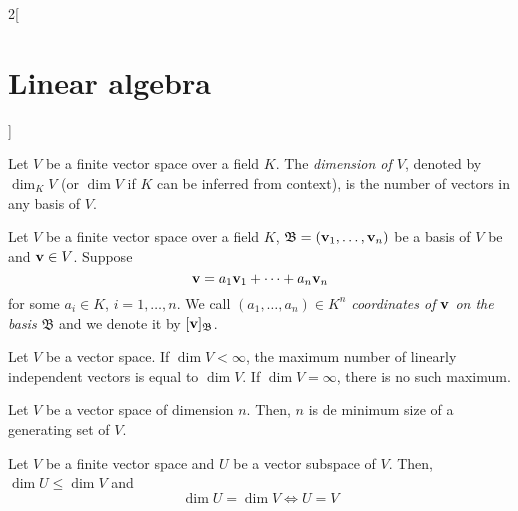 \documentclass[../../../main.tex]{subfiles}
\begin{document}
\begin{multicols}{2}[\section{Linear algebra}]
\begin{lemma}
  \end{lemma}
  \begin{definition}
    Let $V$ be a finite vector space over a field $K$. The \textit{dimension of $V$}, denoted by $\dim_K V$ (or $\dim V$ if $K$ can be inferred from context), is the number of vectors in any basis of $V$.
  \end{definition}
  \begin{definition}
    Let $V$ be a finite vector space over a field $K$, $\mathfrak{B}=(\boldsymbol{\mathrm{v}}_1,\ldots,\boldsymbol{\mathrm{v}}_n)$ be a basis of $V$ be and $\boldsymbol{\mathrm{v}}\in V$. Suppose $$\boldsymbol{\mathrm{v}}=a_1\boldsymbol{\mathrm{v}}_1+\cdots+a_n\boldsymbol{\mathrm{v}}_n$$ for some $a_i\in K$, $i=1,\ldots,n$. We call $(a_1,\ldots,a_n)\in K^n$ \textit{coordinates of $\boldsymbol{\mathrm{v}}$ on the basis $\mathfrak{B}$} and we denote it by $[\boldsymbol{\mathrm{v}}]_{\mathfrak{B}}$.
  \end{definition}
  \begin{prop}
    Let $V$ be a vector space. If $\dim V<\infty$, the maximum number of linearly independent vectors is equal to $\dim V$. If $\dim V=\infty$, there is no such maximum.
  \end{prop}
  \begin{prop}
    Let $V$ be a vector space of dimension $n$. Then, $n$ is de minimum size of a generating set of $V$.
  \end{prop}
  \begin{prop}
    Let $V$ be a finite vector space and $U$ be a vector subspace of $V$. Then, $\dim U\leq\dim V$ and $$\dim U=\dim V\iff U=V$$
  \end{prop}

\end{multicols}
\end{document}
